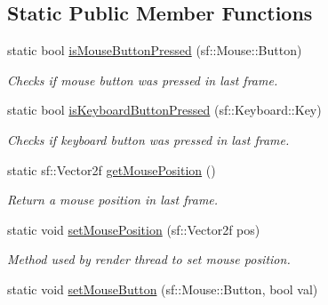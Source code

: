 \subsection*{Static Public Member Functions}
\begin{DoxyCompactItemize}
\item 
\hypertarget{classControls_aecd624927fa3cb6f93840f6f54166a7d}{static bool \hyperlink{classControls_aecd624927fa3cb6f93840f6f54166a7d}{is\-Mouse\-Button\-Pressed} (sf\-::\-Mouse\-::\-Button)}\label{classControls_aecd624927fa3cb6f93840f6f54166a7d}

\begin{DoxyCompactList}\small\item\em Checks if mouse button was pressed in last frame. \end{DoxyCompactList}\item 
\hypertarget{classControls_aa5b1c1b937b98d56c254d0dc03127313}{static bool \hyperlink{classControls_aa5b1c1b937b98d56c254d0dc03127313}{is\-Keyboard\-Button\-Pressed} (sf\-::\-Keyboard\-::\-Key)}\label{classControls_aa5b1c1b937b98d56c254d0dc03127313}

\begin{DoxyCompactList}\small\item\em Checks if keyboard button was pressed in last frame. \end{DoxyCompactList}\item 
\hypertarget{classControls_a33cdde7d51fac2bf9d10576e5830fc8a}{static sf\-::\-Vector2f \hyperlink{classControls_a33cdde7d51fac2bf9d10576e5830fc8a}{get\-Mouse\-Position} ()}\label{classControls_a33cdde7d51fac2bf9d10576e5830fc8a}

\begin{DoxyCompactList}\small\item\em Return a mouse position in last frame. \end{DoxyCompactList}\item 
\hypertarget{classControls_aed9325228a745cecf3e0954dcf8c4ba2}{static void \hyperlink{classControls_aed9325228a745cecf3e0954dcf8c4ba2}{set\-Mouse\-Position} (sf\-::\-Vector2f pos)}\label{classControls_aed9325228a745cecf3e0954dcf8c4ba2}

\begin{DoxyCompactList}\small\item\em Method used by render thread to set mouse position. \end{DoxyCompactList}\item 
\hypertarget{classControls_af83748c1a16006ff82aae6b51a61dada}{static void \hyperlink{classControls_af83748c1a16006ff82aae6b51a61dada}{set\-Mouse\-Button} (sf\-::\-Mouse\-::\-Button, bool val)}\label{classControls_af83748c1a16006ff82aae6b51a61dada}


\end{DoxyCompactItemize}
